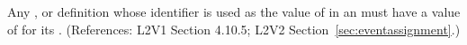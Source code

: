 Any \Compartment, \Species or \Parameter definition whose identifier is
used as the value of  in an \EventAssignment must have a
value of  for its  .  (References: 
L2V1 Section 4.10.5; L2V2 Section~\ref{sec:eventassignment}.)
